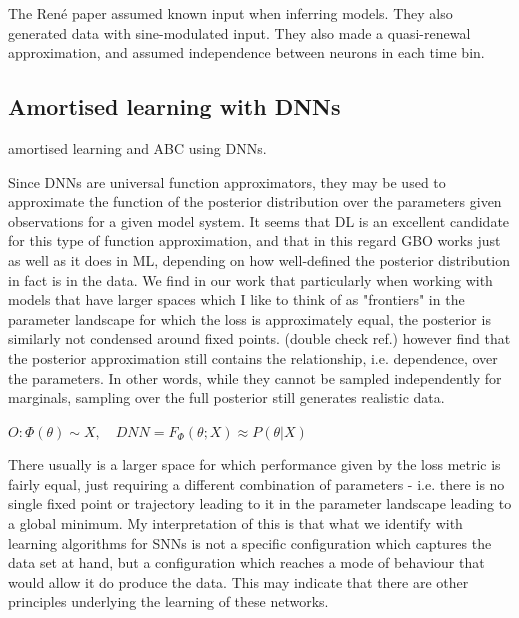 \documentclass[mphil,deptreport,ai]{infthesis} %
\begin{document}
The René paper assumed known input when inferring models. They also generated data with sine-modulated input.
They also made a quasi-renewal approximation, and assumed independence between neurons in each time bin.


\subsection{Amortised learning with DNNs}

\cite{Lueckmann2018} amortised learning and ABC using DNNs.

Since DNNs are universal function approximators, they may be used to approximate the function of the posterior distribution over the parameters given observations for a given model system.
It seems that DL is an excellent candidate for this type of function approximation, and that in this regard GBO works just as well as it does in ML, depending on how well-defined the posterior distribution in fact is in the data.
We find in our work that particularly when working with models that have larger spaces which I like to think of as "frontiers" in the parameter landscape for which the loss is approximately equal, the posterior is similarly not condensed around fixed points.
\cite{Lueckmann2021} (double check ref.) however find that the posterior approximation still contains the relationship, i.e. dependence, over the parameters. 
In other words, while they cannot be sampled independently for marginals, sampling over the full posterior still generates realistic data.


\begin{math}
    O: \Phi(\theta) \sim X, \quad
    DNN = F_\Phi(\theta; X) \approx P(\theta|X)
\end{math}

There usually is a larger space for which performance given by the loss metric is fairly equal, just requiring a different combination of parameters - i.e. there is no single fixed point or trajectory leading to it in the parameter landscape leading to a global minimum.
My interpretation of this is that what we identify with learning algorithms for SNNs is not a specific configuration which captures the data set at hand, but a configuration which reaches a mode of behaviour that would allow it do produce the data.
This may indicate that there are other principles underlying the learning of these networks.
\end{document}
